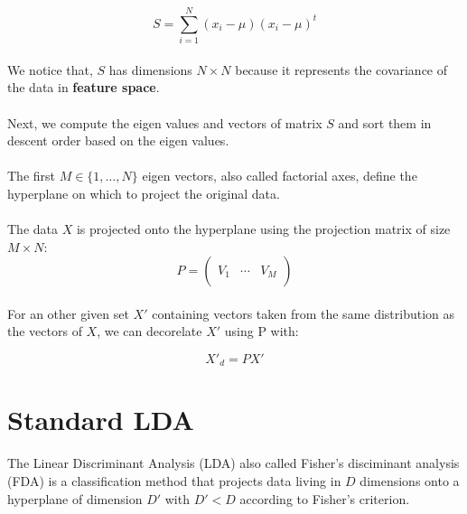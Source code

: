 \documentclass[a4paper]{article}
\begin{document}
$$ S = \sum_{i = 1}^N (x_i - \mu)(x_i - \mu)^t $$

\paragraph{}
We notice that, $S$ has dimensions $N \times N$ because it represents the covariance of the data in \textbf{feature space}.

\paragraph{}
Next, we compute the eigen values and vectors of matrix $S$ and sort them in descent order based on the eigen values.

\paragraph{}
The first $M \in \{1, \ldots, N\}$ eigen vectors, also called factorial axes, define the hyperplane on which to project the original data.

\paragraph{}
The data $X$ is projected onto the hyperplane using the projection matrix of size $M \times N$:
$$ P = \left( \begin{array}{ccc}
 &  &  \\
V_1 & \cdots & V_M \\
 &  &  \end{array} \right) $$ 

\paragraph{}
For an other given set $X'$ containing vectors taken from the same distribution as the vectors of $X$, we can decorelate $X'$ using P with:

$$ X'_d = PX'$$

\section*{Standard LDA}


\paragraph{}

The Linear Discriminant Analysis (LDA) also called Fisher's disciminant analysis (FDA) is a classification method that projects data living in $D$ dimensions onto a hyperplane of dimension $D'$ with $D' < D$ according to Fisher's criterion. 
\end{document}
